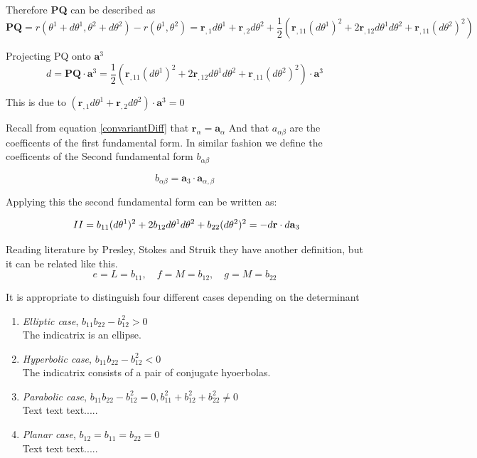 Therefore \textbf{PQ} can be described as
$$
\textbf{PQ} = r(\theta^1 + d\theta^1, \theta^2 + d\theta^2) - r(\theta^1, \theta^2) =  \textbf{r}_{,1} d\theta^1 + \textbf{r}_{,2} d\theta^2 + \frac{1}{2}(\textbf{r}_{,11}(d\theta^1)^2 + 2\textbf{r}_{,12}d\theta^1 d\theta^2 + \textbf{r}_{,11}(d\theta^2)^2) 
$$

Projecting PQ onto $\textbf{a}^3$ 
$$
d = \textbf{PQ}\cdot\textbf{a}^3 = \frac{1}{2}(\textbf{r}_{,11}(d\theta^1)^2 + 2\textbf{r}_{,12}d\theta^1 d\theta^2 + \textbf{r}_{,11}(d\theta^2)^2) \cdot \textbf{a}^3 
$$

This is due to $(\textbf{r}_{,1} d\theta^1 + \textbf{r}_{,2}d\theta^2)\cdot\textbf{a}^3 = 0$

Recall from equation \ref{convariantDiff} that $\textbf{r}_\alpha = \textbf{a}_\alpha$ And that $a_{\alpha\beta}$ are the coefficents of the first fundamental form. In similar fashion we define the coefficents of the Second fundamental form $b_{\alpha\beta}$ 

\begin{equation}
b_{\alpha\beta} = \textbf{a}_3 \cdot \textbf{a}_{\alpha,\beta} 
\end{equation}

Applying this the second fundamental form can be written as:

$$ ~\upperRomannumeral{2} = b_{11}(d\theta^1)^2 + 2b_{12}d\theta^1 d\theta^2 + b_{22}(d\theta^2)^2 = -d\textbf{r}\cdot d\textbf{a}_3$$

Reading literature by Presley, Stokes and Struik they have another definition, but it can be related like this.
$$ e = L = b_{11} ,\quad  f= M = b_{12},\quad
 g = M = b_{22}$$


It is appropriate to distinguish four different cases depending on the determinant

\begin{enumerate}
\item \textit{Elliptic case}, $ b_{11}b_{22}-b_{12}^2  > 0$ \\
The indicatrix is an ellipse.
\item \textit{Hyperbolic case}, $b_{11}b_{22}-b_{12}^2 < 0$ \\
The indicatrix consists of a pair of conjugate hyoerbolas.
\item \textit{Parabolic case}, $b_{11}b_{22}-b_{12}^2 = 0, b_{11}^2 + b_{12}^2 + b_{22}^2 \neq 0 $ \\
Text text text.....
\item \textit{Planar case}, $b_{12} = b_{11} = b_{22} = 0$ \\
Text text text.....
\end{enumerate}



